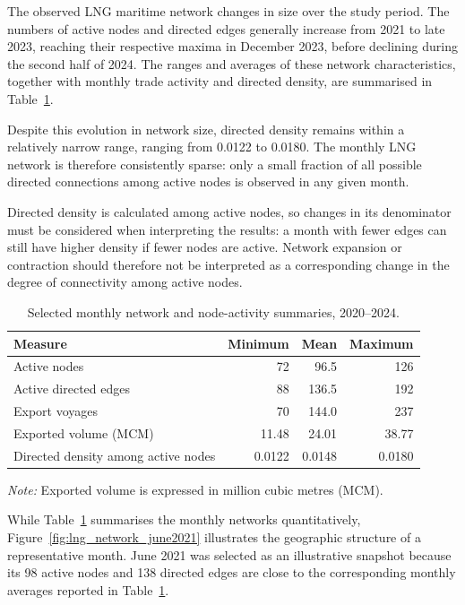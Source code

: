 \documentclass[pdftex,12pt,openright,a4paper,oneside]{book}
\begin{document}
The observed LNG maritime network changes in size over the study period. 
The numbers of active nodes and directed edges generally increase from 2021 to late 2023, reaching their respective maxima in December 2023, before declining during the second half of 2024.
The ranges and averages of these network characteristics, together with monthly trade activity and directed density, are summarised in Table~\ref{tab:eda_monthly_summary}.

Despite this evolution in network size, directed density remains within a relatively narrow range, ranging from 0.0122 to 0.0180. 
The monthly LNG network is therefore consistently sparse: only a small fraction of all possible directed connections among active nodes is observed in any given month.

Directed density is calculated among active nodes, so changes in its denominator must be considered when interpreting the results: a month with fewer edges can still have higher density if fewer nodes are active. 
Network expansion or contraction should therefore not be interpreted as a corresponding change in the degree of connectivity among active nodes.

\begin{table}[htbp]
  \centering
  \caption{Selected monthly network and node-activity summaries, 2020--2024.}
  \label{tab:eda_monthly_summary}
  \begin{tabular}{lrrr}
    \hline
    Measure & Minimum & Mean & Maximum \\
    \hline
    Active nodes & 72 & 96.5 & 126 \\
    Active directed edges & 88 & 136.5 & 192 \\
    Export voyages & 70 & 144.0 & 237 \\
    Exported volume (MCM) & 11.48 & 24.01 & 38.77 \\
    Directed density among active nodes & 0.0122 & 0.0148 & 0.0180 \\
    \hline
  \end{tabular}
  
  \par\smallskip
    {\footnotesize
    \textit{Note:} Exported volume is expressed in million cubic metres (MCM).
  \par}
\end{table}

While Table~\ref{tab:eda_monthly_summary} summarises the monthly networks quantitatively, Figure~\ref{fig:lng_network_june2021} illustrates the geographic structure of a representative month. 
June 2021 was selected as an illustrative snapshot because its 98 active nodes and 138 directed edges are close to the corresponding monthly averages reported in Table~\ref{tab:eda_monthly_summary}.
\end{document}

